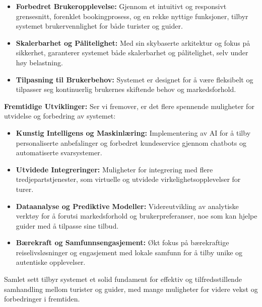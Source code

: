 \documentclass[../doc.tex]{subfiles}
\begin{document}
\begin{itemize}
    \item \textbf{Forbedret Brukeropplevelse:} Gjennom et intuitivt og responsivt grensesnitt, forenklet bookingprosess, og en rekke nyttige funksjoner, tilbyr systemet brukervennlighet for både turister og guider.
    
    \item \textbf{Skalerbarhet og Pålitelighet:} Med sin skybaserte arkitektur og fokus på sikkerhet, garanterer systemet både skalerbarhet og pålitelighet, selv under høy belastning.
    
    \item \textbf{Tilpasning til Brukerbehov:} Systemet er designet for å være fleksibelt og tilpasser seg kontinuerlig brukernes skiftende behov og markedsforhold.
\end{itemize}

\textbf{Fremtidige Utviklinger:}
Ser vi fremover, er det flere spennende muligheter for utvidelse og forbedring av systemet:

\begin{itemize}
    \item \textbf{Kunstig Intelligens og Maskinlæring:} Implementering av AI for å tilby personaliserte anbefalinger og forbedret kundeservice gjennom chatbots og automatiserte svarsystemer.
    
    \item \textbf{Utvidede Integreringer:} Muligheter for integrering med flere tredjepartstjenester, som virtuelle og utvidede virkelighetsopplevelser for turer.
    
    \item \textbf{Dataanalyse og Prediktive Modeller:} Videreutvikling av analytiske verktøy for å forutsi markedsforhold og brukerpreferanser, noe som kan hjelpe guider med å tilpasse sine tilbud.
    
    \item \textbf{Bærekraft og Samfunnsengasjement:} Økt fokus på bærekraftige reiselivsløsninger og engasjement med lokale samfunn for å tilby unike og autentiske opplevelser.
\end{itemize}

Samlet sett tilbyr systemet et solid fundament for effektiv og tilfredsstillende samhandling mellom turister og guider, med mange muligheter for videre vekst og forbedringer i fremtiden.
\end{document}

